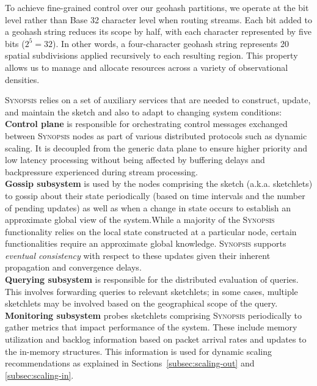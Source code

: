 To achieve fine-grained control over our geohash partitions, we operate at the bit level rather than Base 32 character level when routing streams. Each bit added to a geohash string reduces its scope by half, with each character represented by five bits ($2^5 = 32$). In other words, a four-character geohash string represents 20 spatial subdivisions applied recursively to each resulting region. This property allows us to manage and allocate resources across a variety of observational densities.

\textsc{Synopsis} relies on a set of auxiliary services that are needed to construct, update, and maintain the sketch and also to adapt to changing system conditions:
\vspace{0.5em} \\
	\textbf{Control plane} is responsible for orchestrating control messages exchanged between \textsc{Synopsis} nodes as part of various distributed protocols such as dynamic scaling.
    It is decoupled from the generic data plane to ensure higher priority and low latency processing without being affected by buffering delays and backpressure experienced during stream processing.
\vspace{0.4em} \\
	\textbf{Gossip subsystem} is used by the nodes comprising the sketch (a.k.a. sketchlets) to gossip about their state periodically (based on time intervals and the number of pending updates) as well as when a change in state occurs to establish an approximate global view of the system.While a majority of the \textsc{Synopsis} functionality relies on the local state constructed at a particular node, certain functionalities require an approximate global knowledge. 
    \textsc{Synopsis} supports \emph{eventual consistency} with respect to these updates given their inherent propagation and convergence delays.
\vspace{0.4em} \\
	\textbf{Querying subsystem} is responsible for the distributed evaluation of queries.
    This involves forwarding queries to relevant sketchlets; in some cases, multiple sketchlets may be involved based on the geographical scope of the query.
\vspace{0.8em} \\
    \textbf{Monitoring subsystem} probes sketchlets comprising \textsc{Synopsis} periodically to gather metrics that impact performance of the system.
    These include memory utilization and backlog information based on packet arrival rates and updates to the in-memory structures.
    This information is used for dynamic scaling recommendations as explained in Sections~\ref{subsec:scaling-out} and \ref{subsec:scaling-in}.
